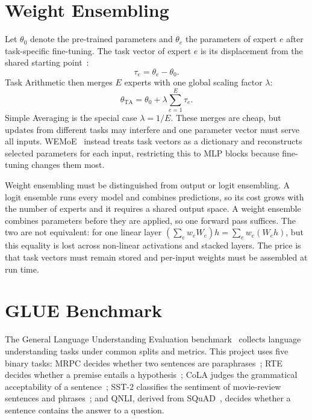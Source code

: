 \section{Weight Ensembling}
\label{sec:we-background}

Let $\theta_0$ denote the pre-trained parameters and $\theta_e$ the parameters of expert $e$ after task-specific fine-tuning. The task vector of expert $e$ is its displacement from the shared starting point~\cite{ilharco2023task}:
\begin{equation}
\tau_e=\theta_e-\theta_0 .
\label{eq:task-vector}
\end{equation}
Task Arithmetic then merges $E$ experts with one global scaling factor $\lambda$:
\begin{equation}
\theta_{\mathrm{TA}}=\theta_0+\lambda\sum_{e=1}^{E}\tau_e .
\label{eq:ta}
\end{equation}
Simple Averaging is the special case $\lambda=1/E$. These merges are cheap, but updates from different tasks may interfere and one parameter vector must serve all inputs. WEMoE~\cite{tang2024wemoe} instead treats task vectors as a dictionary and reconstructs selected parameters for each input, restricting this to MLP blocks because fine-tuning changes them most.

Weight ensembling must be distinguished from output or logit ensembling. A logit ensemble runs every model and combines predictions, so its cost grows with the number of experts and it requires a shared output space. A weight ensemble combines parameters before they are applied, so one forward pass suffices. The two are not equivalent: for one linear layer $(\sum_e w_e W_e)h=\sum_e w_e(W_eh)$, but this equality is lost across non-linear activations and stacked layers. The price is that task vectors must remain stored and per-input weights must be assembled at run time.

\section{GLUE Benchmark}

The General Language Understanding Evaluation benchmark~\cite{wang2019glue} collects language understanding tasks under common splits and metrics. This project uses five binary tasks: MRPC decides whether two sentences are paraphrases~\cite{dolan2005mrpc}; RTE decides whether a premise entails a hypothesis~\cite{dagan2006rte}; CoLA judges the grammatical acceptability of a sentence~\cite{warstadt2019cola}; SST-2 classifies the sentiment of movie-review sentences and phrases~\cite{socher2013sst}; and QNLI, derived from SQuAD~\cite{rajpurkar2016squad}, decides whether a sentence contains the answer to a question.